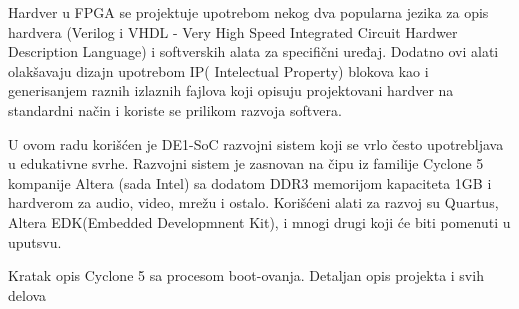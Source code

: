Hardver u FPGA se projektuje upotrebom nekog dva popularna jezika za opis hardvera (Verilog i VHDL - Very High Speed Integrated Circuit Hardwer Description Language) i softverskih alata za specifični uređaj. Dodatno ovi alati olakšavaju dizajn upotrebom IP( Intelectual Property) blokova kao i generisanjem raznih izlaznih fajlova koji opisuju projektovani hardver na standardni način i koriste se prilikom razvoja softvera.

U ovom radu korišćen je DE1-SoC razvojni sistem koji se vrlo često upotrebljava u edukativne svrhe. Razvojni sistem je zasnovan na čipu iz familije Cyclone 5 kompanije Altera (sada Intel) sa dodatom DDR3 memorijom kapaciteta 1GB i hardverom za audio, video, mrežu i ostalo. Korišćeni alati za razvoj su Quartus, Altera EDK(Embedded Developmnent Kit), i mnogi drugi koji će biti pomenuti u uputsvu.

Kratak opis Cyclone 5 sa procesom boot-ovanja.
Detaljan opis projekta i svih delova

